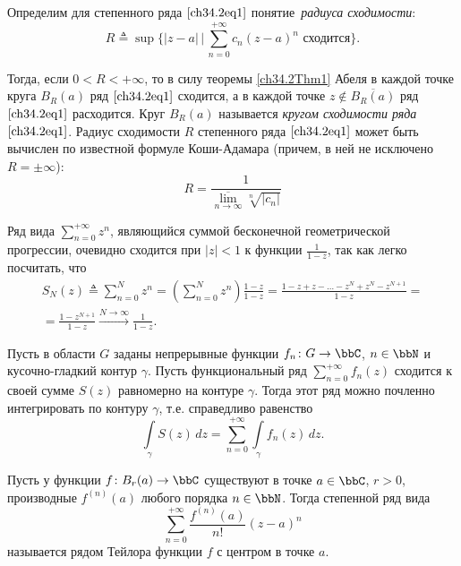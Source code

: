 Определим для степенного ряда $\eqref{ch34.2eq1}$ понятие~\textit{радиуса сходимости}:
\begin{equation} \label{ch34.2eq2}
R \triangleq \sup \{ |z - a| \,\big|\, \sum_{n = 0}^{+\infty} c_n (z - a)^n \text{ сходится} \}.
\end{equation}

Тогда, если $0 < R < +\infty$, то в силу теоремы \ref{ch34.2Thm1} Абеля в каждой точке круга $B_R(a)$ ряд $\eqref{ch34.2eq1}$ сходится, а в каждой точке $z \notin \overline{B_R(a)}$ ряд $\eqref{ch34.2eq1}$ расходится. Круг $B_R(a)$ называется \textit{кругом сходимости ряда} $\eqref{ch34.2eq1}$.
Радиус сходимости $R$ степенного ряда $\eqref{ch34.2eq1}$ может быть вычислен по известной формуле Коши-Адамара (причем, в ней не исключено $R=\pm\infty$):
\begin{equation} \label{ch34.2eq3}
R = \frac{1}{\overline{\lim\limits_{n \to \infty}} \sqrt[n]{|c_n|}}
\end{equation}

\begin{exmpl} \label{exmpl2}
Ряд вида $\sum\limits_{n = 0}^{+\infty} z^n$, являющийся суммой бесконечной геометрической прогрессии, очевидно сходится при $|z| < 1$ к функции $\frac{1}{1 - z}$, так как легко посчитать, что
\begin{multline*}
S_N(z) \triangleq \sum\limits_{n = 0}^{N} z^n = \left( \sum\limits_{n = 0}^{N} z^n \right) \frac{1 - z}{1 - z} =\frac{1-z+z-\dots-z^N+z^N-z^{N+1}}{1-z}=\\= \frac{1 - z^{N + 1}}{1 - z}  \xrightarrow{N \to \infty} \frac{1}{1 - z}. \tag*{\qedhere}
\end{multline*}
\end{exmpl} 
\begin{stt} \label{ch34stt1000}
Пусть в области $G$ заданы непрерывные функции $f_n\colon G \to \bbC$, $n \in \bbN$ и кусочно-гладкий контур $\gamma$. Пусть функциональный ряд $\sum\limits_{n = 0}^{+\infty}f_n(z)$ сходится к своей сумме $S(z)$ равномерно на контуре $\gamma$. Тогда этот ряд можно почленно интегрировать по контуру $\gamma$, т.е. справедливо равенство 
\begin{equation} \label{ch34eq1000} 
\int\limits_{\gamma}S(z) \,dz = \sum\limits_{n = 0}^{+\infty} \int\limits_{\gamma} f_n(z) \,dz. 
\end{equation} 

\end{stt}
\begin{defn}
Пусть у функции $f \colon B_r(a) \to \bbC$ существуют в точке $a \in \bbC$, $r > 0$, производные $f^{(n)}(a)$ любого порядка $n \in \bbN$. Тогда степенной ряд вида
\begin{equation} \label{ch34.2eq4}
\sum\limits_{n = 0}^{+\infty} \frac{f^{(n)}(a)}{n!} (z - a)^n
\end{equation}
называется $\textit{рядом Тейлора функции f}$ с центром в точке $a$.
\end{defn}

